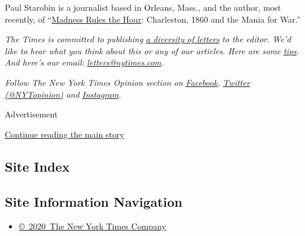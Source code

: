 Paul Starobin is a journalist based in Orleans, Mass., and the author,
most recently, of
``\href{https://www.publicaffairsbooks.com/titles/paul-starobin/madness-rules-the-hour/9781610396233/}{Madness
Rules the Hour}: Charleston, 1860 and the Mania for War.''

\emph{The Times is committed to publishing}
\href{https://www.nytimes.com/2019/01/31/opinion/letters/letters-to-editor-new-york-times-women.html}{\emph{a
diversity of letters}} \emph{to the editor. We'd like to hear what you
think about this or any of our articles. Here are some}
\href{https://help.nytimes.com/hc/en-us/articles/115014925288-How-to-submit-a-letter-to-the-editor}{\emph{tips}}\emph{.
And here's our email:}
\href{mailto:letters@nytimes.com}{\emph{letters@nytimes.com}}\emph{.}

\emph{Follow The New York Times Opinion section on}
\href{https://www.facebook.com/nytopinion}{\emph{Facebook}}\emph{,}
\href{http://twitter.com/NYTOpinion}{\emph{Twitter (@NYTopinion)}}
\emph{and}
\href{https://www.instagram.com/nytopinion/}{\emph{Instagram}}\emph{.}

Advertisement

\protect\hyperlink{after-bottom}{Continue reading the main story}

\hypertarget{site-index}{%
\subsection{Site Index}\label{site-index}}

\hypertarget{site-information-navigation}{%
\subsection{Site Information
Navigation}\label{site-information-navigation}}

\begin{itemize}
\tightlist
\item
  \href{https://help.nytimes.com/hc/en-us/articles/115014792127-Copyright-notice}{©~2020~The
  New York Times Company}
\end{itemize}

